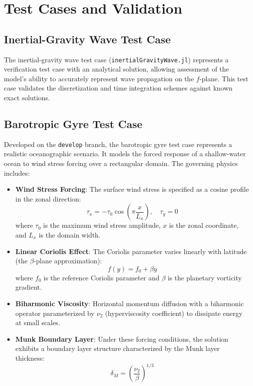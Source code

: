 \documentclass[12pt]{my-preprint}
\begin{document}
\section{Test Cases and Validation}

\subsection{Inertial-Gravity Wave Test Case}
The inertial-gravity wave test case (\texttt{inertialGravityWave.jl}) represents a verification test case with an analytical solution, allowing assessment of the model's ability to accurately represent wave propagation on the $f$-plane. This test case validates the discretization and time integration schemes against known exact solutions.

\subsection{Barotropic Gyre Test Case}
Developed on the \texttt{develop} branch, the barotropic gyre test case represents a realistic oceanographic scenario. It models the forced response of a shallow-water ocean to wind stress forcing over a rectangular domain. The governing physics includes:

\begin{itemize}
    \item \textbf{Wind Stress Forcing}: The surface wind stress is specified as a cosine profile in the zonal direction:
    \begin{equation}
        \tau_x = -\tau_0 \cos\left(\pi \frac{x}{L_x}\right), \quad \tau_y = 0
    \end{equation}
    where $\tau_0$ is the maximum wind stress amplitude, $x$ is the zonal coordinate, and $L_x$ is the domain width.
    
    \item \textbf{Linear Coriolis Effect}: The Coriolis parameter varies linearly with latitude (the $\beta$-plane approximation):
    \begin{equation}
        f(y) = f_0 + \beta y
    \end{equation}
    where $f_0$ is the reference Coriolis parameter and $\beta$ is the planetary vorticity gradient.
    
    \item \textbf{Biharmonic Viscosity}: Horizontal momentum diffusion with a biharmonic operator parameterized by $\nu_2$ (hyperviscosity coefficient) to dissipate energy at small scales.
    
    \item \textbf{Munk Boundary Layer}: Under these forcing conditions, the solution exhibits a boundary layer structure characterized by the Munk layer thickness:
    \begin{equation}
        \delta_M = \left(\frac{\nu_2}{\beta}\right)^{1/3}
    \end{equation}
\end{itemize}
\end{document}
